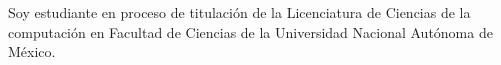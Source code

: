 
Soy estudiante en proceso de titulación de la Licenciatura de Ciencias de la computación en Facultad de Ciencias de la Universidad Nacional Autónoma de México. 

